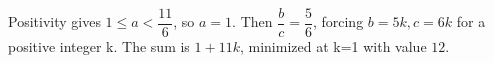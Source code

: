 Positivity gives $1\le a<\dfrac{11}{6}$, so $a=1$. Then $\dfrac{b}{c}=\dfrac{5}{6}$, forcing $b=5k,c=6k$ for a positive integer k. The sum is $1+11k$, minimized at k=1 with value $\boxed{12}$.
